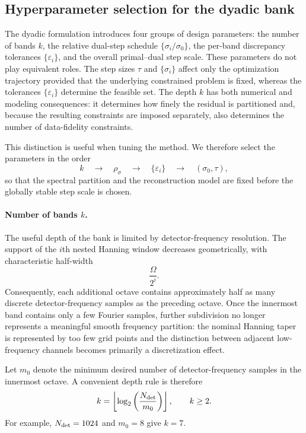 \documentclass{article}
\begin{document}
\subsection{Hyperparameter selection for the dyadic bank}
\label{sec:dyadic-hyper}

The dyadic formulation introduces four groups of design parameters:
the number of bands $k$, the relative dual-step schedule
$\{\sigma_i/\sigma_0\}$, the per-band discrepancy tolerances
$\{\varepsilon_i\}$, and the overall primal--dual step scale.
These parameters do not play equivalent roles.  The step sizes
$\tau$ and $\{\sigma_i\}$ affect only the optimization trajectory
provided that the underlying constrained problem is fixed, whereas
the tolerances $\{\varepsilon_i\}$ determine the feasible set.
The depth $k$ has both numerical and modeling consequences: it
determines how finely the residual is partitioned and, because the
resulting constraints are imposed separately, also determines the
number of data-fidelity constraints.

This distinction is useful when tuning the method.  We therefore
select the parameters in the order
\[
k
\quad\longrightarrow\quad
\rho_\sigma
\quad\longrightarrow\quad
\{\varepsilon_i\}
\quad\longrightarrow\quad
(\sigma_0,\tau),
\]
so that the spectral partition and the reconstruction model are fixed
before the globally stable step scale is chosen.

\paragraph{Number of bands $k$.}
The useful depth of the bank is limited by detector-frequency
resolution.  The support of the $i$th nested Hanning window decreases
geometrically, with characteristic half-width
\[
\frac{\Omega}{2^i}.
\]
Consequently, each additional octave contains approximately half as
many discrete detector-frequency samples as the preceding octave.
Once the innermost band contains only a few Fourier samples, further
subdivision no longer represents a meaningful smooth frequency
partition: the nominal Hanning taper is represented by too few grid
points and the distinction between adjacent low-frequency channels
becomes primarily a discretization effect.

Let $m_0$ denote the minimum desired number of detector-frequency
samples in the innermost octave.  A convenient depth rule is therefore
\begin{equation}
\label{eq:dyadic-k}
k
=
\left\lfloor
\log_2\left(\frac{N_{\rm det}}{m_0}\right)
\right\rfloor,
\qquad
k\ge2.
\end{equation}
For example, $N_{\rm det}=1024$ and $m_0=8$ give $k=7$.
\end{document}
